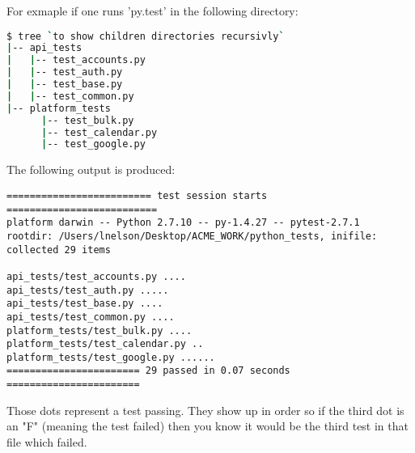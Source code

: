 For exmaple if one runs 'py.test' in the following directory:
\begin{lstlisting}[language=bash]
$ tree `to show children directories recursivly`
|-- api_tests
|   |-- test_accounts.py
|   |-- test_auth.py
|   |-- test_base.py
|   |-- test_common.py
|-- platform_tests
      |-- test_bulk.py
      |-- test_calendar.py
      |-- test_google.py
\end{lstlisting}

The following output is produced:

\begin{lstlisting}
========================= test session starts ==========================
platform darwin -- Python 2.7.10 -- py-1.4.27 -- pytest-2.7.1
rootdir: /Users/lnelson/Desktop/ACME_WORK/python_tests, inifile:
collected 29 items

api_tests/test_accounts.py ....
api_tests/test_auth.py .....
api_tests/test_base.py ....
api_tests/test_common.py ....
platform_tests/test_bulk.py ....
platform_tests/test_calendar.py ..
platform_tests/test_google.py ......
======================= 29 passed in 0.07 seconds =======================
\end{lstlisting}
\begin{info}
Those dots represent a test passing. They show up in order so if the third dot is an "F" (meaning the test failed) then you know it would be the third test in that file which failed.
\end{info}

